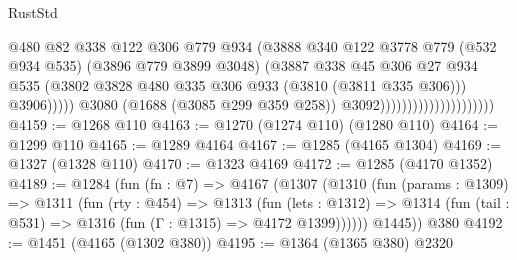 \begin{lexlean}{RustStd}
\begin{coremodule}
                                                    @480
                                                    @82
                                                    @338
                                                    @122
                                                    @306
                                                    @779
                                                    @934
                                                    (@3888
                                                      @340
                                                      @122
                                                      @3778
                                                      @779
                                                      (@532 @934 @535)
                                                      (@3896 @779 @3899 @3048)
                                                      (@3887
                                                        @338
                                                        @45
                                                        @306
                                                        @27
                                                        @934
                                                        @535
                                                        (@3802
                                                          @3828
                                                          @480
                                                          @335
                                                          @306
                                                          @933
                                                          (@3810 (@3811 @335 @306)))
                                                        @3906)))))
                                              @3080
                                              (@1688 (@3085 @299 @359 @258))
                                              @3092)))))))))))))))))))))
@4159 := @1268 @110
@4163 := @1270 (@1274 @110) (@1280 @110)
@4164 := @1299 @110
@4165 := @1289 @4164
@4167 := @1285 (@4165 @1304)
@4169 := @1327 (@1328 @110)
@4170 := @1323 @4169
@4172 := @1285 (@4170 @1352)
@4189 := @1284
    (fun (fn : @7) =>
    @4167
      (@1307
        (@1310
          (fun (params : @1309) =>
          @1311
            (fun (rty : @454) =>
            @1313
              (fun (lets : @1312) =>
              @1314 (fun (tail : @531) => @1316 (fun (Γ : @1315) => @4172 @1399))))))
        @1445))
    @380
@4192 := @1451 (@4165 (@1302 @380))
@4195 := @1364 (@1365 @380) @2320

\end{coremodule}
\end{lexlean}
